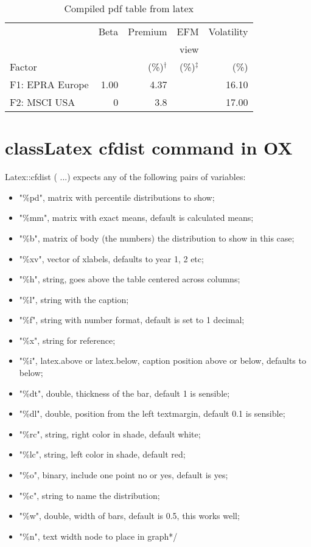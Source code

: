 \documentclass[notitlepage,a4paper]{article}
\begin{document}
\begin{table}[!h]
	\centering
	\caption*{Compiled pdf table from latex}
	\begin{tabular}{l r r r r }
		\toprule
		 & Beta & Premium & EFM  & Volatility\\
		  &  &  & view & \\
		 Factor &  & (\%)$^\dagger$ & (\%)$^\ddag$ & (\%)\\
		 		\midrule
		F1: EPRA Europe &   1.00 	&  4.37 	&  & 16.10\\
        F2: MSCI USA 	 &	 0		&	3.8 	&  & 17.00 \\
         \bottomrule
	\end{tabular}
\end{table}


\clearpage
\section*{classLatex cfdist command in OX}
Latex::cfdist ( ...)
	expects any of the following pairs of variables:
\begin{itemize}
\item		"\%pd", matrix with percentile distributions to show;
\item		"\%mm", matrix with exact means, default is calculated means;
\item		"\%b", matrix of body (the numbers) the distribution to show in this case;
\item		"\%xv", vector of xlabels, defaults to year 1, 2 etc;
\item		"\%h", string, goes above the table centered across columns;
\item		"\%l", string with the caption;
\item		"\%f", string with number format, default is set to 1 decimal;
\item		"\%x", string for reference;
\item		"\%i", latex.above or latex.below, caption position above or below, defaults to below;
\item		"\%dt", double, thickness of the bar, default 1 is sensible;
\item		"\%dl", double, position from the left textmargin, default 0.1 is sensible;
\item		"\%rc", string, right color in shade, default white;
\item		"\%lc", string, left color in shade, default red;
\item		"\%o", binary, include one point no or yes, default is yes;
\item		"\%c", string to name the distribution;
\item		"\%w", double, width of bars, default is 0.5, this works well;
\item		"\%n", text width node to place in graph*/
\end{itemize}
\end{document}
